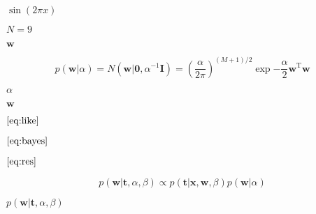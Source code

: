 \documentclass[10pt]{book}
\begin{document}
\begin{mdSnippets}
\begin{mdInlineSnippet}%
$\sin(2\pi x)$\end{mdInlineSnippet}%
\begin{mdInlineSnippet}[585cd78c368b5c8db9642eaf2a530bf3]%
$N=9$\end{mdInlineSnippet}%
\begin{mdInlineSnippet}[e8d1025023b4b2aa1dda755aa92e085d]%
$\textbf{w}$\end{mdInlineSnippet}%
\begin{mdDisplaySnippet}[5d91ef97984ea6b4db0e06cd490ff7f3]%
\[%
p(\textbf{w}|\alpha)=N(\textbf{w}|\textbf{0},\alpha^{-1}\textbf{I})=(\frac{\alpha}{2\pi})^{(M+1)/2}\exp{-\frac{\alpha}{2}\textbf{w}^\mathrm{T}\textbf{w}}
\]%
\end{mdDisplaySnippet}%
\begin{mdInlineSnippet}[7b7f9dbfea05c83784f8b85149852f08]%
$\alpha$\end{mdInlineSnippet}%
\begin{mdInlineSnippet}[e8d1025023b4b2aa1dda755aa92e085d]%
$\textbf{w}$\end{mdInlineSnippet}%
\begin{mdInlineSnippet}[a53f74acc9e996629960a6f26220a3c4]%
$\eqref{eq:like}$\end{mdInlineSnippet}%
\begin{mdInlineSnippet}%
$\eqref{eq:bayes}$\end{mdInlineSnippet}%
\begin{mdInlineSnippet}[3da096be3b9fb9cc35b5e03a81f05002]%
$\eqref{eq:res}$\end{mdInlineSnippet}%
\begin{mdDisplaySnippet}[7b2cc400fe6d8f130b09ae96bb12c991]%
\[%
p(\textbf{w}|\textbf{t},\alpha,\beta) \propto p(\textbf{t}|\textbf{x},\textbf{w},\beta)p(\textbf{w}|\alpha)
\]%
\end{mdDisplaySnippet}%
\begin{mdInlineSnippet}%
$p(\textbf{w}|\textbf{t},\alpha,\beta) $\end{mdInlineSnippet}%
\begin{mdInlineSnippet}[e8d1025023b4b2aa1dda755aa92e085d]%

\end{mdInlineSnippet}
\end{mdSnippets}
\end{document}
